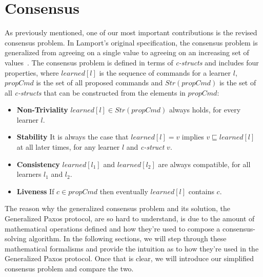 \chapter{Consensus}

As previously mentioned, one of our most important contributions is the revised consensus problem. In Lamport's original specification, the consensus problem is generalized from agreeing on a single value to agreeing on an increasing set of values~\cite{Lamport2005}. The consensus problem is defined in terms of \textit{c-structs} and includes four properties, where $learned[l]$ is the sequence of commands for a learner $l$, $propCmd$ is the set of all proposed commands and $Str(propCmd)$ is the set of all \textit{c-structs} that can be constructed from the elements in $propCmd$:
\begin{itemize}
	\item \textbf{Non-Triviality} $learned[l] \in Str(propCmd)$ always holds, for every learner $l$.
	\item \textbf{Stability} It is always the case that $learned[l] = v$ implies $v \sqsubseteq learned[l]$ at all later times, for any learner $l$ and \textit{c-struct} $v$.
	\item \textbf{Consistency} $learned[l_1]$ and $learned[l_2]$ are always compatible, for all learners $l_1$ and $l_2$.
	\item \textbf{Liveness} If $c \in propCmd$ then eventually $learned[l]$ contains $c$.
\end{itemize}

\par
The reason why the generalized consensus problem and its solution, the Generalized Paxos protocol, are so hard to understand, is due to the amount of mathematical operations defined and how they're used to compose a consensus-solving algorithm. In the following sections, we will step through these mathematical formalisms and provide the intuition as to how they're used in the Generalized Paxos protocol. Once that is clear, we will introduce our simplified consensus problem and compare the two.

